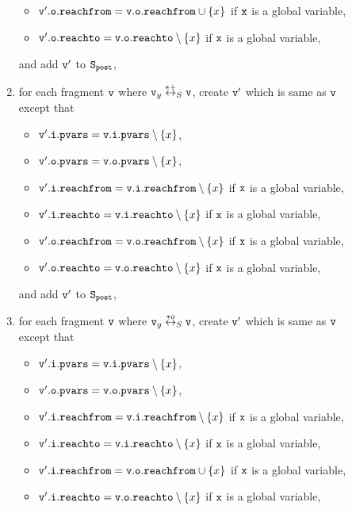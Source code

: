 \begin{description}
\begin{enumerate}
\begin{itemize}
 \item $\mathtt{v}'.\mathtt{o}.\mathtt{reachfrom} = \mathtt{v}.\mathtt{o}.\mathtt{reachfrom} \cup \left\{x\right\}$ if $\tt x$ is a global variable,
 \item $\mathtt{v}'.\mathtt{o}.\mathtt{reachto} = \mathtt{v}.\mathtt{o}.\mathtt{reachto} \setminus \left\{x\right\}$ if $\tt x$ is a global variable,

\end{itemize}
and add $\mathtt{v}'$ to $\tt S_{post}$,
\item for each fragment $\mathtt{v}$ where $\mathtt{v}_y \overset{*+}\leftrightarrow_S \mathtt{v}$, create $\mathtt{v}'$ which is same as $\mathtt{v}$ except that
\begin{itemize}
\item $\mathtt{v}'.\mathtt{i}.\mathtt{pvars} = \mathtt{v}.\mathtt{i}.\mathtt{pvars} \setminus \left\{x\right\}$,
\item $\mathtt{v}'.\mathtt{o}.\mathtt{pvars} = \mathtt{v}.\mathtt{o}.\mathtt{pvars} \setminus \left\{x\right\}$,
\item $\mathtt{v}'.\mathtt{i}.\mathtt{reachfrom} = \mathtt{v}.\mathtt{i}.\mathtt{reachfrom} \setminus \left\{x\right\}$ if $\tt x$ is a global variable,
\item $\mathtt{v}'.\mathtt{i}.\mathtt{reachto} = \mathtt{v}.\mathtt{i}.\mathtt{reachto} \setminus \left\{x\right\}$ if $\tt x$ is a global variable,
\item $\mathtt{v}'.\mathtt{o}.\mathtt{reachfrom} = \mathtt{v}.\mathtt{o}.\mathtt{reachfrom} \setminus \left\{x\right\}$ if $\tt x$ is a global variable,
\item $\mathtt{v}'.\mathtt{o}.\mathtt{reachto} = \mathtt{v}.\mathtt{o}.\mathtt{reachto} \setminus \left\{x\right\}$ if $\tt x$ is a global variable,
\end{itemize}
and add $\mathtt{v}'$ to $\tt S_{post}$,
\item for each fragment $\mathtt{v}$ where $\mathtt{v}_y \overset{*o}\leftrightarrow_S \mathtt{v}$, create $\mathtt{v}'$ which is same as $\mathtt{v}$ except that
\begin{itemize}
\item $\mathtt{v}'.\mathtt{i}.\mathtt{pvars} = \mathtt{v}.\mathtt{i}.\mathtt{pvars} \setminus \left\{x\right\}$,
\item $\mathtt{v}'.\mathtt{o}.\mathtt{pvars} = \mathtt{v}.\mathtt{o}.\mathtt{pvars} \setminus \left\{x\right\}$,
\item $\mathtt{v}'.\mathtt{i}.\mathtt{reachfrom} = \mathtt{v}.\mathtt{i}.\mathtt{reachfrom} \setminus \left\{x\right\}$ if $\tt x$ is a global variable,
\item $\mathtt{v}'.\mathtt{i}.\mathtt{reachto} = \mathtt{v}.\mathtt{i}.\mathtt{reachto} \setminus \left\{x\right\}$ if $\tt x$ is a global variable,
\item $\mathtt{v}'.\mathtt{i}.\mathtt{reachfrom} = \mathtt{v}.\mathtt{o}.\mathtt{reachfrom} \cup \left\{x\right\}$ if $\tt x$ is a global variable,
\item $\mathtt{v}'.\mathtt{i}.\mathtt{reachto} = \mathtt{v}.\mathtt{o}.\mathtt{reachto} \setminus \left\{x\right\}$ if $\tt x$ is a global variable,

\end{itemize}
\end{enumerate}
\end{description}

